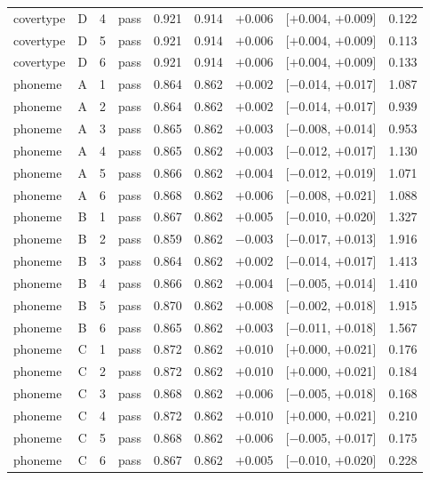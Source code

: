 {\begin{longtable}{lccl rrrcr}
covertype & D & 4 & pass & 0.921 & 0.914 & $+$0.006 & [$+$0.004, $+$0.009] & 0.122 \\
covertype & D & 5 & pass & 0.921 & 0.914 & $+$0.006 & [$+$0.004, $+$0.009] & 0.113 \\
covertype & D & 6 & pass & 0.921 & 0.914 & $+$0.006 & [$+$0.004, $+$0.009] & 0.133 \\
\midrule
phoneme & A & 1 & pass & 0.864 & 0.862 & $+$0.002 & [$-$0.014, $+$0.017] & 1.087 \\
phoneme & A & 2 & pass & 0.864 & 0.862 & $+$0.002 & [$-$0.014, $+$0.017] & 0.939 \\
phoneme & A & 3 & pass & 0.865 & 0.862 & $+$0.003 & [$-$0.008, $+$0.014] & 0.953 \\
phoneme & A & 4 & pass & 0.865 & 0.862 & $+$0.003 & [$-$0.012, $+$0.017] & 1.130 \\
phoneme & A & 5 & pass & 0.866 & 0.862 & $+$0.004 & [$-$0.012, $+$0.019] & 1.071 \\
phoneme & A & 6 & pass & 0.868 & 0.862 & $+$0.006 & [$-$0.008, $+$0.021] & 1.088 \\
\addlinespace[2pt]
phoneme & B & 1 & pass & 0.867 & 0.862 & $+$0.005 & [$-$0.010, $+$0.020] & 1.327 \\
phoneme & B & 2 & pass & 0.859 & 0.862 & $-$0.003 & [$-$0.017, $+$0.013] & 1.916 \\
phoneme & B & 3 & pass & 0.864 & 0.862 & $+$0.002 & [$-$0.014, $+$0.017] & 1.413 \\
phoneme & B & 4 & pass & 0.866 & 0.862 & $+$0.004 & [$-$0.005, $+$0.014] & 1.410 \\
phoneme & B & 5 & pass & 0.870 & 0.862 & $+$0.008 & [$-$0.002, $+$0.018] & 1.915 \\
phoneme & B & 6 & pass & 0.865 & 0.862 & $+$0.003 & [$-$0.011, $+$0.018] & 1.567 \\
\addlinespace[2pt]
phoneme & C & 1 & pass & 0.872 & 0.862 & $+$0.010 & [$+$0.000, $+$0.021] & 0.176 \\
phoneme & C & 2 & pass & 0.872 & 0.862 & $+$0.010 & [$+$0.000, $+$0.021] & 0.184 \\
phoneme & C & 3 & pass & 0.868 & 0.862 & $+$0.006 & [$-$0.005, $+$0.018] & 0.168 \\
phoneme & C & 4 & pass & 0.872 & 0.862 & $+$0.010 & [$+$0.000, $+$0.021] & 0.210 \\
phoneme & C & 5 & pass & 0.868 & 0.862 & $+$0.006 & [$-$0.005, $+$0.017] & 0.175 \\
phoneme & C & 6 & pass & 0.867 & 0.862 & $+$0.005 & [$-$0.010, $+$0.020] & 0.228 \\

\end{longtable}}
